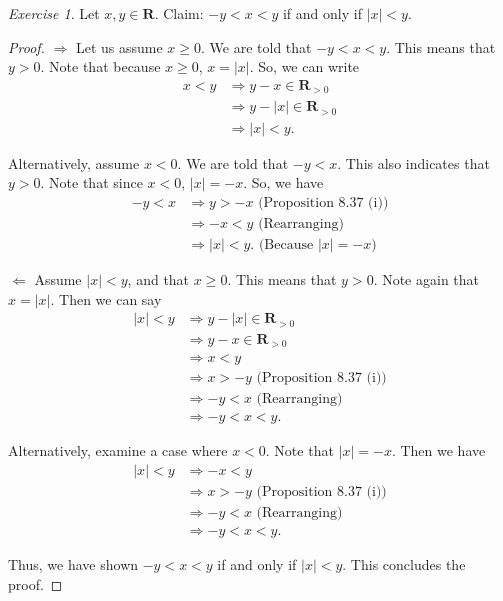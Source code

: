 \documentclass[12pt,oneside]{amsart}
\theoremstyle{remark}
\newtheorem{exer}{Exercise}
\newcommand{\bfR}{\mathbf{R}}
\begin{document}
%
%
%
%
\newpage
\begin{exer}
Let $x, y \in \bfR$. Claim: $-y < x < y$ if and only if $|x| < y$.
\end{exer}
\begin{proof}
$\Rightarrow$ Let us assume $x \geq 0$. We are told that $-y < x < y$. This means that $y > 0$. Note that because $x \geq 0$, $x = |x|$. So, we can write
\begin{equation}
\begin{split}
x < y &\Rightarrow y - x \in \bfR_{>0} \\
      &\Rightarrow y - |x| \in \bfR_{>0} \\
      &\Rightarrow |x| < y.
\end{split}
\end{equation}

Alternatively, assume $x < 0$. We are told that $-y < x$. This also indicates that $y > 0$. Note that since $x < 0$, $|x| = -x$. So, we have
\begin{equation}
\begin{split}
-y < x &\Rightarrow y > -x \text{ (Proposition 8.37 (i))} \\
       &\Rightarrow -x < y \text{ (Rearranging)} \\
       &\Rightarrow |x| < y. \text{ (Because $|x| = -x$)}
\end{split}
\end{equation}

$\Leftarrow$ Assume $|x| < y$, and that $x \geq 0$. This means that $y > 0$. Note again that $x = |x|$. Then we can say
\begin{equation}
\begin{split}
|x| < y &\Rightarrow y - |x| \in \bfR_{>0} \\
        &\Rightarrow y - x \in \bfR_{>0} \\
        &\Rightarrow x < y \\
        &\Rightarrow x > -y \text{ (Proposition 8.37 (i))} \\
        &\Rightarrow -y < x \text{ (Rearranging)} \\
        &\Rightarrow -y < x < y.
\end{split}
\end{equation}

Alternatively, examine a case where $x < 0$. Note that $|x| = -x$. Then we have
\begin{equation}
\begin{split}
|x| < y &\Rightarrow -x < y \\
        &\Rightarrow x > -y \text{ (Proposition 8.37 (i))} \\
        &\Rightarrow -y < x \text{ (Rearranging)} \\
        &\Rightarrow -y < x < y.
\end{split}
\end{equation}

Thus, we have shown $-y < x < y$ if and only if $|x| < y$. This concludes the proof.
\end{proof}
\end{document}
